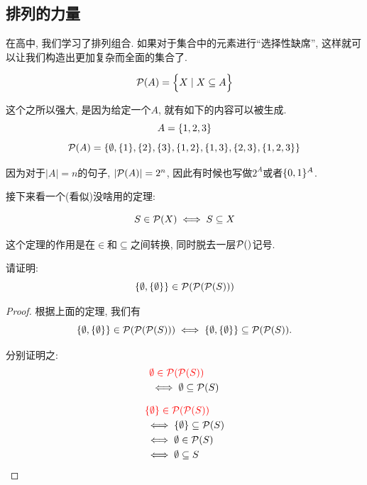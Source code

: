 \subsection{排列的力量}

在高中, 我们学习了排列组合. 如果对于集合中的元素进行``选择性缺席'', 这样就可以让我们构造出更加复杂而全面的集合了. 

\begin{definition}[幂集 (Powerset)]
  \[
    \mathcal{P}(A) = \Big\{X \mid X \subseteq A\Big\}
  \]
\end{definition}

这个之所以强大, 是因为给定一个$A$, 就有如下的内容可以被生成. 
  \[
    A = \{1, 2, 3\}
  \]
  \[
    \mathcal{P}(A) = \{\emptyset,
      \{1\}, \{2\}, \{3\},
      \{1, 2\}, \{1, 3\}, \{2, 3\},
      \{1, 2, 3\}\}
  \]

因为对于$|A| = n$的句子, $|\mathcal{P}(A)| = 2^{n}$, 因此有时候也写做$2^{A}$或者$\{0,1\}^{A}$. 

接下来看一个(看似)没啥用的定理: 

\begin{theorem}
  $$S \in \mathcal{P}(X) \iff S \subseteq X$$
\end{theorem}

这个定理的作用是在$\in$和$\subseteq$之间转换, 同时脱去一层$\mathcal{P}()$记号. 

\begin{eg}
  请证明: 
  $$\{\emptyset, \{\emptyset\}\} \in \mathcal{P}(\mathcal{P}(\mathcal{P}(S)))$$
\end{eg}

\begin{proof}
  根据上面的定理, 我们有
  $$\{\emptyset, \{\emptyset\}\} \in \mathcal{P}(\mathcal{P}(\mathcal{P}(S))) \iff \{\emptyset, \{\emptyset\}\} \subseteq \mathcal{P}(\mathcal{P}(S)).$$

  分别证明之: 
  \begin{align*}
    &\textcolor{red}{\emptyset \in \mathcal{P}(\mathcal{P}(S))}\\
    &\iff \emptyset \subseteq \mathcal{P}(S)
  \end{align*}

  \begin{align*}
    &\textcolor{red}{\{\emptyset\} \in \mathcal{P}(\mathcal{P}(S))}\\
    &\iff \{\emptyset\} \subseteq \mathcal{P}(S)\\
    &\iff \emptyset \in \mathcal{P}(S)\\
    &\iff \emptyset \subseteq S
  \end{align*}

\end{proof}

